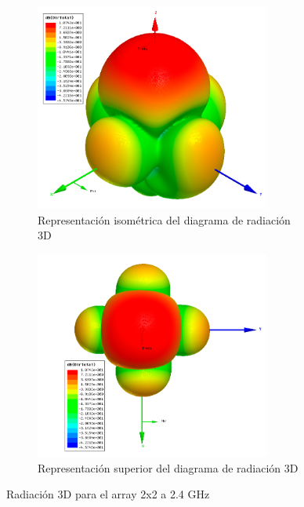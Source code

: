 \begin{figure}[H]
     \centering
     \begin{subfigure}[b]{0.7\textwidth}
         \centering
         \includegraphics[width=0.85\textwidth]{archivos/analisis/2x21/6}
         \caption{Representación isométrica del diagrama de radiación 3D}
         \label{fig:3d12x21}
     \end{subfigure}
     \hfill
     \begin{subfigure}[b]{0.7\textwidth}
         \centering
         \includegraphics[width=0.85\textwidth]{archivos/analisis/2x21/7}
         \caption{Representación superior del diagrama de radiación 3D}
         \label{fig:3d22x21}
     \end{subfigure}
     \hfill
        \caption{Radiación 3D para el array 2x2 a 2.4 GHz}
        \label{fig:3d2x21}
\end{figure}

